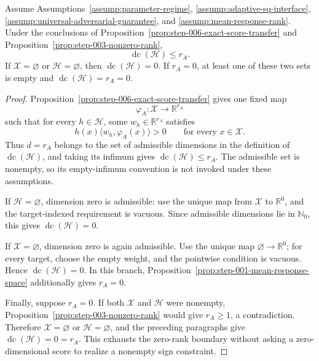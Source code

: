 \begin{lemma}
\label{lem:step-006-dimension-admissibility}
Assume Assumptions~\ref{assump:parameter-regime},
\ref{assump:adaptive-sq-interface},
\ref{assump:universal-adversarial-guarantee}, and
\ref{assump:mean-response-rank}.  Under the conclusions of
Proposition~\ref{prop:step-006-exact-score-transfer}
and Proposition~\ref{prop:step-003-nonzero-rank},
\[
\operatorname{dc}(\mathcal H)\le r_A.
\]
If \(\mathcal X=\varnothing\) or \(\mathcal H=\varnothing\), then
\(\operatorname{dc}(\mathcal H)=0\).  If \(r_A=0\), at least one of these
two sets is empty and
\(\operatorname{dc}(\mathcal H)=r_A=0\).
\end{lemma}

\begin{proof}
Proposition~\ref{prop:step-006-exact-score-transfer} gives one fixed map
\[
\varphi_A:\mathcal X\to\mathbb R^{r_A}
\]
such that for every \(h\in\mathcal H\), some \(w_h\in\mathbb R^{r_A}\)
satisfies
\[
h(x)\langle w_h,\varphi_A(x)\rangle>0
\qquad\text{for every }x\in\mathcal X.
\]
Thus \(d=r_A\) belongs to the set of admissible dimensions in the definition
of \(\operatorname{dc}(\mathcal H)\), and taking its infimum gives
\(\operatorname{dc}(\mathcal H)\le r_A\).  The admissible set is nonempty,
so its empty-infimum convention is not invoked under these assumptions.

If \(\mathcal H=\varnothing\), dimension zero is admissible: use the unique
map from \(\mathcal X\) to \(\mathbb R^0\), and the target-indexed
requirement is vacuous.  Since admissible dimensions lie in \(\mathbb N_0\),
this gives \(\operatorname{dc}(\mathcal H)=0\).

If \(\mathcal X=\varnothing\), dimension zero is again admissible.  Use the
unique map \(\varnothing\to\mathbb R^0\); for every target, choose the empty
weight, and the pointwise condition is vacuous.  Hence
\(\operatorname{dc}(\mathcal H)=0\).  In this branch,
Proposition~\ref{prop:step-001-mean-response-space} additionally gives
\(r_A=0\).

Finally, suppose \(r_A=0\).  If both \(\mathcal X\) and \(\mathcal H\) were
nonempty, Proposition~\ref{prop:step-003-nonzero-rank} would give
\(r_A\ge1\), a contradiction.  Therefore \(\mathcal X=\varnothing\) or
\(\mathcal H=\varnothing\), and the preceding paragraphs give
\(\operatorname{dc}(\mathcal H)=0=r_A\).  This exhausts the zero-rank
boundary without asking a zero-dimensional score to realize a nonempty sign
constraint.
\end{proof}

